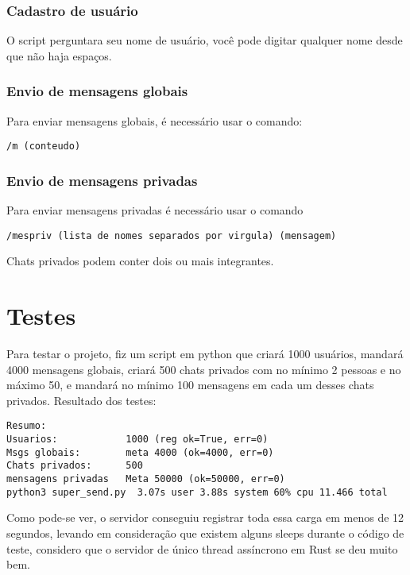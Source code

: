 \documentclass{article}
\begin{document}
{{        \subsubsection{Cadastro de usuário}
         O script perguntara seu nome de usuário, você pode digitar qualquer nome desde que não haja espaços.
        \subsubsection{Envio de mensagens globais}
        {
            Para enviar mensagens globais, é necessário usar o comando:
            \begin{verbatim}
/m (conteudo)
            \end{verbatim}
        }
        \subsubsection{Envio de mensagens privadas}
        {
            Para enviar mensagens privadas é necessário usar o comando
                \begin{verbatim}
/mespriv (lista de nomes separados por virgula) (mensagem)
                \end{verbatim}
                Chats privados podem conter dois ou mais integrantes.
        }
        
    }

    \section{Testes}
    {
        Para testar o projeto, fiz um script em python que criará 1000 usuários, mandará 4000 mensagens globais, criará 500 chats privados com no mínimo 2 pessoas e no máximo 50, e mandará no mínimo 100 mensagens em cada um desses chats privados.
        Resultado dos testes:
        
        \begin{verbatim}
Resumo:
Usuarios:            1000 (reg ok=True, err=0)
Msgs globais:        meta 4000 (ok=4000, err=0)
Chats privados:      500
mensagens privadas   Meta 50000 (ok=50000, err=0)
python3 super_send.py  3.07s user 3.88s system 60% cpu 11.466 total
        \end{verbatim}
        Como pode-se ver, o servidor conseguiu registrar toda essa carga em menos de 12 segundos, levando em consideração que existem alguns sleeps durante o código de teste, considero que o servidor de único thread assíncrono em Rust se deu muito bem.
    }
}
\end{document}
